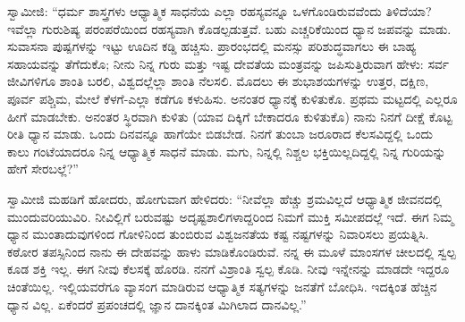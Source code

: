  ಸ್ವಾಮೀಜಿ: “ಧರ್ಮ ಶಾಸ್ತ್ರಗಳು ಆಧ್ಯಾತ್ಮಿಕ ಸಾಧನೆಯ ಎಲ್ಲಾ ರಹಸ್ಯವನ್ನೂ ಒಳಗೊಂಡಿರುವವೆಂದು ತಿಳಿದೆಯಾ? ಇವೆಲ್ಲಾ ಗುರುಶಿಷ್ಯ ಪರಂಪರೆಯಿಂದ ರಹಸ್ಯವಾಗಿ ಕೊಡಲ್ಪಡುತ್ತವೆ. ಬಹು ಎಚ್ಚರಿಕೆಯಿಂದ ಧ್ಯಾನ ಜಪವನ್ನು ಮಾಡು. ಸುವಾಸನಾ ಪುಷ್ಪಗಳನ್ನು ಇಟ್ಟು ಊದಿನ ಕಡ್ಡಿ ಹಚ್ಚಿಸು. ಪ್ರಾರಂಭದಲ್ಲಿ ಮನಸ್ಸು ಪರಿಶುದ್ಧವಾಗಲು ಈ ಬಾಹ್ಯ ಸಹಾಯವನ್ನು ತೆಗೆದುಕೊ; ನೀನು ನಿನ್ನ ಗುರು ಮತ್ತು ಇಷ್ಟ ದೇವತೆಯ ಮಂತ್ರವನ್ನು ಜಪಿಸುತ್ತಿರುವಾಗ ಹೇಳು: ಸರ್ವ ಜೀವಿಗಳಿಗೂ ಶಾಂತಿ ಬರಲಿ, ವಿಶ್ವದಲ್ಲೆಲ್ಲಾ ಶಾಂತಿ ನೆಲಸಲಿ. ಮೊದಲು ಈ ಶುಭಾಶಯಗಳನ್ನು ಉತ್ತರ, ದಕ್ಷಿಣ, ಪೂರ್ವ ಪಶ್ಚಿಮ, ಮೇಲೆ ಕೆಳಗೆ-ಎಲ್ಲಾ ಕಡೆಗೂ ಕಳುಹಿಸು. ಅನಂತರ ಧ್ಯಾನಕ್ಕೆ ಕುಳಿತುಕೊ. ಪ್ರಥಮ ಮಟ್ಟದಲ್ಲಿ ಎಲ್ಲರೂ ಹೀಗೆ ಮಾಡಬೇಕು. ಅನಂತರ ಸ್ಥಿರವಾಗಿ ಕುಳಿತು (ಯಾವ ದಿಕ್ಕಿಗೆ ಬೇಕಾದರೂ ಕುಳಿತುಕೊ) ನಾನು ನಿನಗೆ ದೀಕ್ಷೆ ಕೊಟ್ಟ ರೀತಿ ಧ್ಯಾನ ಮಾಡು. ಒಂದು ದಿನವನ್ನೂ ಹಾಗೆಯೇ ಬಿಡಬೇಡ. ನಿನಗೆ ತುಂಬಾ ಜರೂರಾದ ಕೆಲಸವಿದ್ದಲ್ಲಿ ಒಂದು ಕಾಲು ಗಂಟೆಯಾದರೂ ನಿನ್ನ ಆಧ್ಯಾತ್ಮಿಕ ಸಾಧನೆ ಮಾಡು. ಮಗು, ನಿನ್ನಲ್ಲಿ ನಿಶ್ಚಲ ಭಕ್ತಿಯಿಲ್ಲದಿದ್ದಲ್ಲಿ ನಿನ್ನ ಗುರಿಯನ್ನು ಹೇಗೆ ಸೇರಬಲ್ಲೆ?” 

 ಸ್ವಾಮೀಜಿ ಮಹಡಿಗೆ ಹೋದರು, ಹೋಗುವಾಗ ಹೇಳಿದರು: “ನೀವೆಲ್ಲಾ ಹೆಚ್ಚು ಶ್ರಮವಿಲ್ಲದೆ ಆಧ್ಯಾತ್ಮಿಕ ಜೀವನದಲ್ಲಿ ಮುಂದುವರಿಯುವಿರಿ. ನೀವಿಲ್ಲಿಗೆ ಬರುವಷ್ಟು ಅದೃಷ್ಟಶಾಲಿಗಳಾದ್ದರಿಂದ ನಿಮಗೆ ಮುಕ್ತಿ ಸಮೀಪದಲ್ಲೆ ಇದೆ. ಈಗ ನಿಮ್ಮ ಧ್ಯಾನ ಮುಂತಾದುವುಗಳಿಂದ ಗೋಳಿನಿಂದ ತುಂಬಿರುವ ವಿಶ್ವಜನತೆಯ ಕಷ್ಟ ನಷ್ಟಗಳನ್ನು ನಿವಾರಿಸಲು ಪ್ರಯತ್ನಿಸಿ. ಕಠೋರ ತಪಸ್ಸಿನಿಂದ ನಾನು ಈ ದೇಹವನ್ನು ಹಾಳು ಮಾಡಿಕೊಂಡಿರುವೆ. ನನ್ನ ಈ ಮೂಳೆ ಮಾಂಸಗಳ ಚೀಲದಲ್ಲಿ ಸ್ವಲ್ಪ ಕೂಡ ಶಕ್ತಿ ಇಲ್ಲ. ಈಗ ನೀವು ಕೆಲಸಕ್ಕೆ ಹೊರಡಿ. ನನಗೆ ವಿಶ್ರಾಂತಿ ಸ್ವಲ್ಪ ಕೊಡಿ. ನೀವು ಇನ್ನೇನನ್ನು ಮಾಡದೇ ಇದ್ದರೂ ಚಿಂತೆಯಿಲ್ಲ. ಇಲ್ಲಿಯವರೆಗೂ ವ್ಯಾಸಂಗ ಮಾಡಿರುವ ಆಧ್ಯಾತ್ಮಿಕ ಸತ್ಯಗಳನ್ನು ಜನತೆಗೆ ಬೋಧಿಸಿ. ಇದಕ್ಕಿಂತ ಹೆಚ್ಚಿನ ಧ್ಯಾನ ವಿಲ್ಲ. ಏಕೆಂದರೆ ಪ್ರಪಂಚದಲ್ಲಿ ಜ್ಞಾನ ದಾನಕ್ಕಿಂತ ಮಿಗಿಲಾದ ದಾನವಿಲ್ಲ.” 

